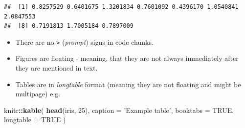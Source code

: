 \documentclass[]{book}
\newenvironment{Shaded}{\begin{snugshade}}{\end{snugshade}}
\newcommand{\KeywordTok}[1]{\textcolor[rgb]{0.13,0.29,0.53}{\textbf{#1}}}
\newcommand{\DataTypeTok}[1]{\textcolor[rgb]{0.13,0.29,0.53}{#1}}
\newcommand{\DecValTok}[1]{\textcolor[rgb]{0.00,0.00,0.81}{#1}}
\newcommand{\StringTok}[1]{\textcolor[rgb]{0.31,0.60,0.02}{#1}}
\newcommand{\OtherTok}[1]{\textcolor[rgb]{0.56,0.35,0.01}{#1}}
\newcommand{\OperatorTok}[1]{\textcolor[rgb]{0.81,0.36,0.00}{\textbf{#1}}}
\newcommand{\NormalTok}[1]{#1}
\providecommand{\tightlist}{%
  \setlength{\itemsep}{0pt}\setlength{\parskip}{0pt}}
\theoremstyle{definition}
\theoremstyle{definition}
\theoremstyle{definition}
\theoremstyle{remark}
\begin{document}
\begin{verbatim}
##  [1] 0.8257529 0.6401675 1.3201834 0.7601092 0.4396170 1.0540841 2.0847553
##  [8] 0.7191813 1.7005184 0.7897009
\end{verbatim}

\begin{itemize}
\tightlist
\item
  There are no \texttt{\textgreater{}} (\emph{prompt}) signs in code
  chunks.
\item
  Figures are floating - meaning, that they are not always immediately
  after they are mentioned in text.
\item
  Tables are in \emph{longtable} format (meaning they are not floating
  and might be multipage) e.g.
\end{itemize}

\begin{Shaded}
\begin{Highlighting}[]
\NormalTok{knitr}\OperatorTok{::}\KeywordTok{kable}\NormalTok{(}
  \KeywordTok{head}\NormalTok{(iris, }\DecValTok{25}\NormalTok{), }\DataTypeTok{caption =} \StringTok{'Example table'}\NormalTok{,}
  \DataTypeTok{booktabs =} \OtherTok{TRUE}\NormalTok{, }\DataTypeTok{longtable =} \OtherTok{TRUE}
\NormalTok{)}
\end{Highlighting}
\end{Shaded}
\end{document}
